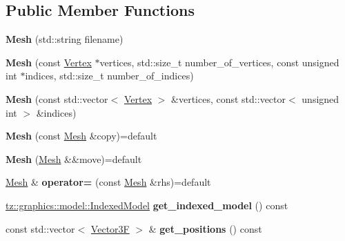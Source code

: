 \subsection*{Public Member Functions}
\begin{DoxyCompactItemize}
\item 
\mbox{\label{class_mesh_a921d7db7d2bd9bfd47db709b2bdd6b5c}} 
{\bfseries Mesh} (std\+::string filename)
\item 
\mbox{\label{class_mesh_ab432ad94f37ef92e72f13927cc44ecc1}} 
{\bfseries Mesh} (const \mbox{\hyperlink{class_vertex}{Vertex}} $\ast$vertices, std\+::size\+\_\+t number\+\_\+of\+\_\+vertices, const unsigned int $\ast$indices, std\+::size\+\_\+t number\+\_\+of\+\_\+indices)
\item 
\mbox{\label{class_mesh_a1bfd1eb4e2530fe0fe46bf798a8b7ecd}} 
{\bfseries Mesh} (const std\+::vector$<$ \mbox{\hyperlink{class_vertex}{Vertex}} $>$ \&vertices, const std\+::vector$<$ unsigned int $>$ \&indices)
\item 
\mbox{\label{class_mesh_a3687e73537a656b1ada92df6f9930206}} 
{\bfseries Mesh} (const \mbox{\hyperlink{class_mesh}{Mesh}} \&copy)=default
\item 
\mbox{\label{class_mesh_aa3e0309c79938d016646e14ae4406009}} 
{\bfseries Mesh} (\mbox{\hyperlink{class_mesh}{Mesh}} \&\&move)=default
\item 
\mbox{\label{class_mesh_aa152c24d58ab422b6d6b24ad9be88a71}} 
\mbox{\hyperlink{class_mesh}{Mesh}} \& {\bfseries operator=} (const \mbox{\hyperlink{class_mesh}{Mesh}} \&rhs)=default
\item 
\mbox{\label{class_mesh_afa09e7ec4e4b2b8846c462bc7f9a3a3e}} 
\mbox{\hyperlink{classtz_1_1graphics_1_1model_1_1_indexed_model}{tz\+::graphics\+::model\+::\+Indexed\+Model}} {\bfseries get\+\_\+indexed\+\_\+model} () const
\item 
\mbox{\label{class_mesh_a613ac182bb9f0034dd51ddcbf00988f2}} 
const std\+::vector$<$ \mbox{\hyperlink{class_vector3}{Vector3F}} $>$ \& {\bfseries get\+\_\+positions} () const
\item 
\mbox{\label{class_mesh_a902ec7b814fccfb3a15b94606a5fa9df}} 

\end{DoxyCompactItemize}
